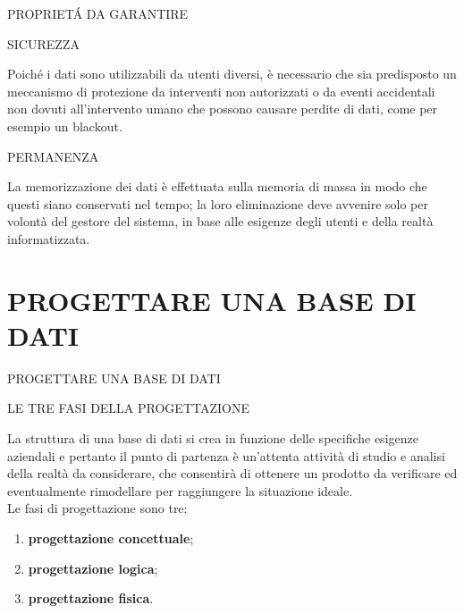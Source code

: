 \documentclass[aspectratio=1610]{beamer}
\begin{document}
\begin{frame}{PROPRIET\'A DA GARANTIRE}
    \begin{alertblock}{SICUREZZA}
        \begin{minipage}{0.98\linewidth}
            \justifying
            Poiché i dati sono utilizzabili da utenti diversi, è necessario che sia
            predisposto un meccanismo di protezione da interventi non autorizzati o da
            eventi accidentali non dovuti all’intervento umano che possono causare
            perdite di dati, come per esempio un blackout.
        \end{minipage}
    \end{alertblock}
    \pause
    \begin{alertblock}{PERMANENZA}
        \begin{minipage}{0.98\linewidth}
            \justifying
            La memorizzazione dei dati è effettuata sulla memoria di massa in modo che
            questi siano conservati nel tempo; la loro eliminazione deve avvenire solo
            per volontà del gestore del sistema, in base alle esigenze degli utenti e della
            realtà informatizzata.
        \end{minipage}
    \end{alertblock}
\end{frame}

\section{PROGETTARE UNA BASE DI DATI}

\begin{frame}{PROGETTARE UNA BASE DI DATI}
    \begin{alertblock}{LE TRE FASI DELLA PROGETTAZIONE}
        \begin{minipage}{0.98\linewidth}
            \justifying
            La struttura di una base di dati si crea in funzione delle specifiche esigenze
            aziendali e pertanto il punto di partenza è un’attenta attività di studio e analisi
            della realtà da considerare, che consentirà di ottenere un prodotto da
            verificare ed eventualmente rimodellare per raggiungere la situazione ideale.\\
            \pause
            Le fasi di progettazione sono tre:
            \begin{enumerate}
                \item \textbf{progettazione concettuale};
                \item \textbf{progettazione logica};
                \item \textbf{progettazione fisica}. 
            \end{enumerate}
        \end{minipage}
    \end{alertblock}
\end{frame}
\end{document}
